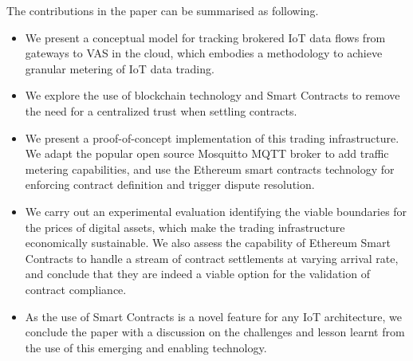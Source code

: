 \documentclass[chi_draft]{sigchi}
\begin{document}

The contributions in the paper can be summarised as following.
%
\begin{itemize}
	\item We present a conceptual model for tracking brokered IoT data flows from gateways to VAS in the cloud, which embodies a methodology to achieve granular metering of IoT data trading.
	\item We explore the use of blockchain technology and Smart Contracts to remove the need for a centralized trust when settling contracts. 
	\item We present a proof-of-concept implementation of this trading infrastructure. We adapt the popular open source Mosquitto MQTT broker to add traffic metering capabilities, and use the Ethereum smart contracts technology for enforcing contract definition and trigger dispute resolution.
	\item We carry out an experimental evaluation identifying the viable boundaries for the prices of digital assets, which make the trading infrastructure economically sustainable.
	We also assess the capability of Ethereum Smart Contracts to handle a stream of contract settlements at varying arrival rate, and conclude that they are indeed a viable option for the validation of contract compliance.
	\item As the use of Smart Contracts is a novel feature for any IoT architecture, we conclude the paper with a discussion on the challenges and lesson learnt from the use of this emerging and enabling technology.
\end{itemize}


\end{document}
